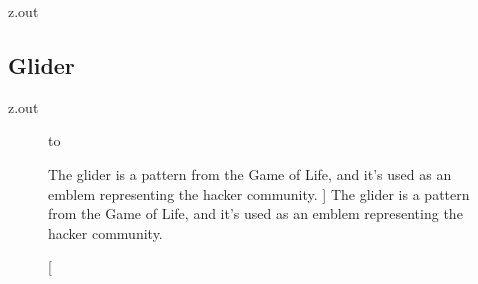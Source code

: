 \MyIOS


\begin{VerbatimOut}{z.out}

\subsection{Glider}
\end{VerbatimOut}

\MyIOT


\begin{VerbatimOut}{z.out}
  
\begin{figure}[ht]
  \hbox to
  \caption
  [%
    The glider
    is a pattern from the Game of Life,
    and it's used as an emblem representing the hacker community.%
  ]
  {%
    The glider \cite{hirzel2012}
    is a pattern from the Game of Life,
    and it's used as an emblem representing the hacker community.%
  }
\end{figure}
\end{VerbatimOut}

\MyIO
